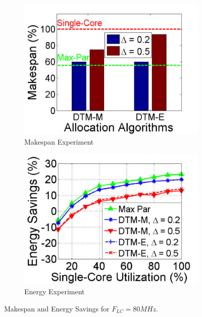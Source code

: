\begin{figure}[!b]
\centering
\begin{subfigure}{.48\columnwidth}
  \centering
  \includegraphics[width=\columnwidth]{./figures/flc_80_util_makespan}
  \caption{Makespan Experiment}
  \label{fig:Flc80-util-makespan}
\end{subfigure}
\begin{subfigure}{.48\columnwidth}
  \centering
  \includegraphics[width=\columnwidth]{./figures/flc_80_util_energy}
  \caption{Energy Experiment}
  \label{fig:Flc80-util-energy}
\end{subfigure}
\vspace{-0.05in}
\caption{Makespan and Energy Savings for $F_{LC} = 80 MHz$.}
\label{fig:Flc80-util}
\end{figure}

